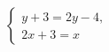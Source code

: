 \begin{ex}
	\begin{condition}
		\( \left\{
		\begin{array}{l}
			y+3=2y-4,\\
			2x+3=x
		\end{array}
		\right. \)
	\end{condition}
\end{ex}